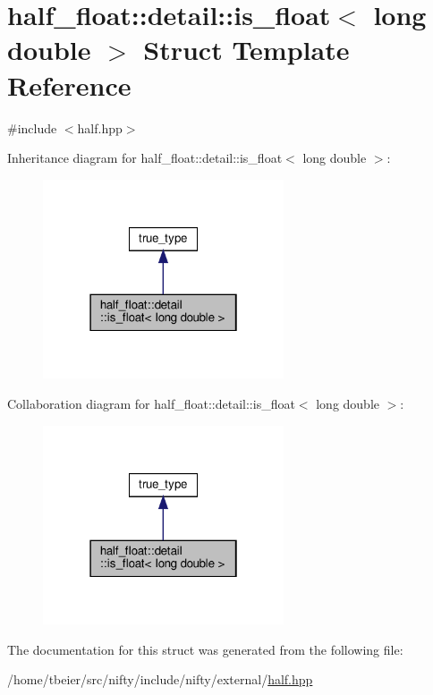\hypertarget{structhalf__float_1_1detail_1_1is__float_3_01long_01double_01_4}{}\section{half\+\_\+float\+:\+:detail\+:\+:is\+\_\+float$<$ long double $>$ Struct Template Reference}
\label{structhalf__float_1_1detail_1_1is__float_3_01long_01double_01_4}


{\ttfamily \#include $<$half.\+hpp$>$}



Inheritance diagram for half\+\_\+float\+:\+:detail\+:\+:is\+\_\+float$<$ long double $>$\+:
\nopagebreak
\begin{figure}[H]
\begin{center}
\leavevmode
\includegraphics[width=202pt]{structhalf__float_1_1detail_1_1is__float_3_01long_01double_01_4__inherit__graph}
\end{center}
\end{figure}


Collaboration diagram for half\+\_\+float\+:\+:detail\+:\+:is\+\_\+float$<$ long double $>$\+:
\nopagebreak
\begin{figure}[H]
\begin{center}
\leavevmode
\includegraphics[width=202pt]{structhalf__float_1_1detail_1_1is__float_3_01long_01double_01_4__coll__graph}
\end{center}
\end{figure}


The documentation for this struct was generated from the following file\+:\begin{DoxyCompactItemize}
\item 
/home/tbeier/src/nifty/include/nifty/external/\hyperlink{half_8hpp}{half.\+hpp}\end{DoxyCompactItemize}

